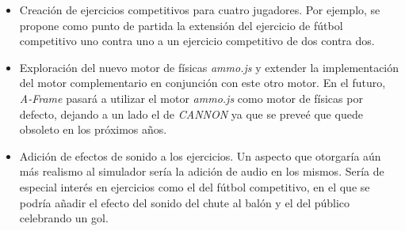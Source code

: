 \begin{itemize}
    \item Creación de ejercicios competitivos para cuatro jugadores. Por ejemplo, se propone como punto de partida la extensión del ejercicio de fútbol competitivo uno contra uno a un ejercicio competitivo de dos contra dos.
    \item Exploración del nuevo motor de físicas \textit{ammo.js} y extender la implementación del motor complementario en conjunción con este otro motor. En el futuro, \textit{A-Frame} pasará a utilizar el motor \textit{ammo.js} como motor de físicas por defecto, dejando a un lado el de \textit{CANNON} ya que se preveé que quede obsoleto en los próximos años.
    \item Adición de efectos de sonido a los ejercicios. Un aspecto que otorgaría aún más realismo al simulador sería la adición de audio en los mismos. Sería de especial interés en ejercicios como el del fútbol competitivo, en el que se podría añadir el efecto del sonido del chute al balón y el del público celebrando un gol.
\end{itemize}
